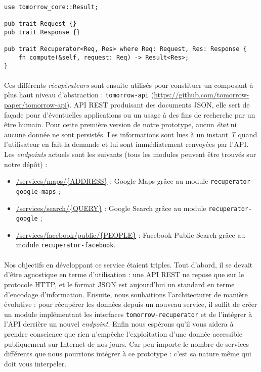 \begin{lstlisting}
use tomorrow_core::Result;

pub trait Request {}
pub trait Response {}

pub trait Recuperator<Req, Res> where Req: Request, Res: Response {
    fn compute(&self, request: Req) -> Result<Res>;
}\end{lstlisting}

\paragraph{} Ces différents \emph{récupérateurs} sont ensuite utilisés pour constituer un composant à plus haut niveau
d'abstraction : \lstinline{tomorrow-api} (\url{https://github.com/tomorrow-paper/tomorrow-api}). API REST produisant des
documents JSON, elle sert de façade pour d'éventuelles applications ou un usage à des fins de recherche par un être humain. 
Pour cette première version de notre prototype, aucun \emph{état} ni aucune donnée ne sont persistés. Les informations 
sont lues à un instant \emph{T} quand l'utilisateur en fait la demande et lui sont immédiatement renvoyées par l'API.
Les \emph{endpoints} actuels sont les suivants (tous les modules peuvent être trouvés sur notre dépôt) :

\begin{itemize}
    \item \url{/services/maps/{ADDRESS}} : Google Maps grâce au module \lstinline{recuperator-google-maps} ;
    \item \url{/services/search/{QUERY}} : Google Search grâce au module \lstinline{recuperator-google} ;
    \item \url{/services/facebook/public/{PEOPLE}} : Facebook Public Search grâce au module \lstinline{recuperator-facebook}.
\end{itemize}

\paragraph{} Nos objectifs en développant ce service étaient triples. Tout d'abord, il se devait d'être agnostique en terme
d'utilisation : une API REST ne repose que sur le protocole HTTP, et le format JSON est aujourd'hui un standard en terme
d'encodage d'information. Ensuite, nous souhaitions l'architecturer de manière évolutive : pour récupérer les données
depuis un nouveau service, il suffit de créer un module implémentant les interfaces \lstinline{tomorrow-recuperator} et
de l'intégrer à l'API derrière un nouvel \emph{endpoint}. Enfin nous espérons qu'il vous aidera à prendre conscience que
rien n'empêche l'exploitation d'une donnée accessible publiquement sur Internet de nos jours. Car peu importe le nombre
de services différents que nous pourrions intégrer à ce prototype : c'est sa nature même qui doit vous interpeler.
